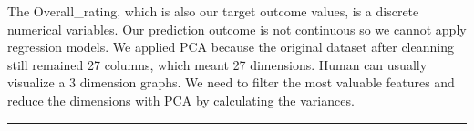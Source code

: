 \documentclass[11pt]{article}
\begin{document}
The Overall\_rating, which is also our target outcome values, is a
discrete numerical variables. Our prediction outcome is not continuous
so we cannot apply regression models. We applied PCA because the
original dataset after cleanning still remained 27 columns, which meant
27 dimensions. Human can usually visualize a 3 dimension graphs. We need
to filter the most valuable features and reduce the dimensions with PCA
by calculating the variances.

    \begin{center}\rule{0.5\linewidth}{\linethickness}\end{center}


    
    
    
    
\end{document}
